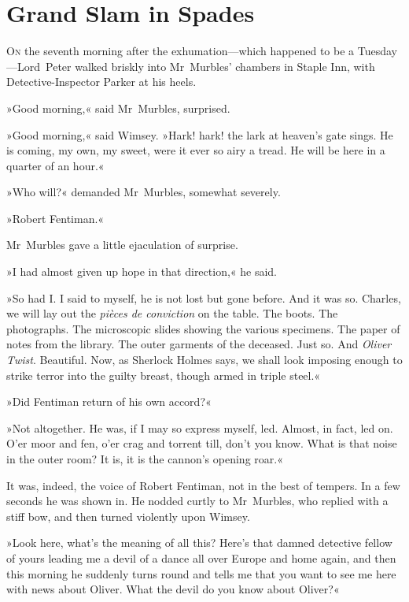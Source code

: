 \chapter{Grand Slam in Spades}

\lettrine[lines=4]{O}{n} the seventh morning after the exhumation—which happen\-ed to be a Tuesday—Lord~Peter walked briskly into Mr~Murb\-les' chambers in Staple Inn, with Detective-Inspector Parker at his heels.

\zz
»Good morning,« said Mr~Murbles, surprised.

»Good morning,« said Wimsey. »Hark! hark! the lark at heaven's gate sings. He is coming, my own, my sweet, were it ever so airy a tread. He will be here in a quarter of an hour.«

»Who will?« demanded Mr~Murbles, somewhat severely.

»Robert Fentiman.«

Mr~Murbles gave a little ejaculation of surprise.

»I had almost given up hope in that direction,« he said.

»So had I. I said to myself, he is not lost but gone before. And it was so. Charles, we will lay out the \textit{pièces de conviction} on the table. The boots. The photographs. The microscopic slides showing the various specimens. The paper of notes from the library. The outer garments of the deceased. Just so. And \textit{Oliver Twist}. Beautiful. Now, as Sherlock Holmes says, we shall look imposing enough to strike terror into the guilty breast, though armed in triple steel.«

»Did Fentiman return of his own accord?«

»Not altogether. He was, if I may so express myself, led. Almost, in fact, led on. O'er moor and fen, o'er crag and torrent till, don't you know. What is that noise in the outer room? It is, it is the cannon's opening roar.«

It was, indeed, the voice of Robert Fentiman, not in the best of tempers. In a few seconds he was shown in. He nodded curtly to Mr~Murbles, who replied with a stiff bow, and then turned violently upon Wimsey.

»Look here, what's the meaning of all this? Here's that damned detective fellow of yours leading me a devil of a dance all over Europe and home again, and then this morning he suddenly turns round and tells me that you want to see me here with news about Oliver. What the devil do you know about Oliver?«

